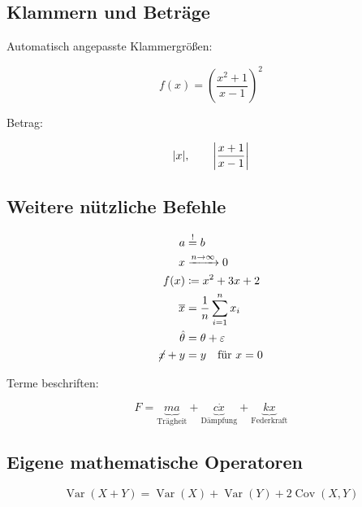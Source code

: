 \documentclass[11pt,a4paper]{scrartcl}
\DeclareMathOperator{\Var}{Var}
\DeclareMathOperator{\Cov}{Cov}
\DeclarePairedDelimiter{\abs}{\lvert}{\rvert}
\begin{document}
	\subsection{Klammern und Beträge}
	
	Automatisch angepasste Klammergrößen:
	
	\begin{equation}
		f(x)=
		\left(
		\frac{x^2+1}{x-1}
		\right)^2
	\end{equation}
	
	Betrag:
	
	\begin{equation}
		\abs{x},\qquad
		\abs*{\frac{x+1}{x-1}}
	\end{equation}
	
	\subsection{Weitere nützliche Befehle}
	
	\begin{align}
		a &\overset{!}{=} b\\
		x &\xrightarrow{n\to\infty} 0\\
		f(x) &\coloneqq x^2+3x+2\\
		\overline{x} &= \frac{1}{n}
		\sum_{i=1}^{n}x_i\\
		\hat{\theta} &= \theta+\varepsilon\\
		\cancel{x} + y &= y
		\quad \text{für }x=0
	\end{align}
	
	Terme beschriften:
	
	\begin{equation}
		F =
		\underbrace{ma}_{\text{Trägheit}}
		+
		\underbrace{c\dot{x}}_{\text{Dämpfung}}
		+
		\underbrace{kx}_{\text{Federkraft}}
	\end{equation}
	
	\subsection{Eigene mathematische Operatoren}
	
	\begin{equation}
		\Var(X+Y)
		=
		\Var(X)+\Var(Y)+2\Cov(X,Y)
	\end{equation}
	
\end{document}
